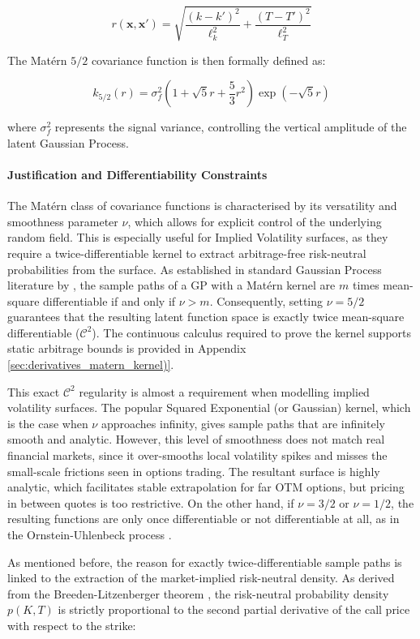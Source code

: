 \documentclass[12pt,oneside]{report}
\theoremstyle{definition}
\theoremstyle{remark}
\begin{document}
$$r(\mathbf{x}, \mathbf{x}') = \sqrt{\frac{(k - k')^2}{\ell_k^2} + \frac{(T - T')^2}{\ell_T^2}}$$

The Matérn $5/2$ covariance function is then formally defined as:

$$k_{5/2}(r) = \sigma_f^2 \left( 1 + \sqrt{5}r + \frac{5}{3}r^2 \right) \exp(-\sqrt{5}r)$$

where $\sigma_f^2$ represents the signal variance, controlling the vertical amplitude of the latent Gaussian Process.
\paragraph{Justification and Differentiability Constraints}

The Matérn class of covariance functions is characterised by its versatility and smoothness parameter $\nu$, which allows for explicit control of the underlying random field. This is especially useful for Implied Volatility surfaces, as they require a twice-differentiable kernel to extract arbitrage-free risk-neutral probabilities from the surface. As established in standard Gaussian Process literature by \citet{rasmussen2006gp}, the sample paths of a GP with a Matérn kernel are $m$ times mean-square differentiable if and only if $\nu > m$. Consequently, setting $\nu = 5/2$ guarantees that the resulting latent function space is exactly twice mean-square differentiable ($\mathcal{C}^2$). The continuous calculus required to prove the kernel supports static arbitrage bounds is provided in Appendix \ref{sec:derivatives_matern_kernel)}. 

This exact $\mathcal{C}^2$ regularity is almost a requirement when modelling implied volatility surfaces. The popular Squared Exponential (or Gaussian) kernel, which is the case when $\nu$ approaches infinity, gives sample paths that are infinitely smooth and analytic. However, this level of smoothness does not match real financial markets, since it over-smooths local volatility spikes and misses the small-scale frictions seen in options trading. The resultant surface is highly analytic, which facilitates stable extrapolation for far OTM options, but pricing in between quotes is too restrictive. On the other hand, if $\nu = 3/2$ or $\nu = 1/2$, the resulting functions are only once differentiable or not differentiable at all, as in the Ornstein-Uhlenbeck process \cite{uhlenbeck1930brownian}.

As mentioned before, the reason for exactly twice-differentiable sample paths is linked to the extraction of the market-implied risk-neutral density. As derived from the Breeden-Litzenberger theorem \cite{breeden1978prices}, the risk-neutral probability density $p(K,T)$ is strictly proportional to the second partial derivative of the call price with respect to the strike:
\end{document}
